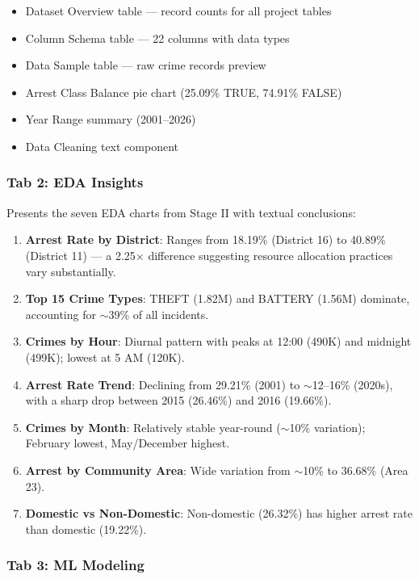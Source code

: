 \begin{itemize}
    \item Dataset Overview table — record counts for all project tables
    \item Column Schema table — 22 columns with data types
    \item Data Sample table — raw crime records preview
    \item Arrest Class Balance pie chart (25.09\% TRUE, 74.91\% FALSE)
    \item Year Range summary (2001--2026)
    \item Data Cleaning text component
\end{itemize}

\subsubsection{Tab 2: EDA Insights}

Presents the seven EDA charts from Stage II with textual conclusions:

\begin{enumerate}
    \item \textbf{Arrest Rate by District}: Ranges from 18.19\% (District 16) to 40.89\% (District 11) — a 2.25$\times$ difference suggesting resource allocation practices vary substantially.
    \item \textbf{Top 15 Crime Types}: THEFT (1.82M) and BATTERY (1.56M) dominate, accounting for $\sim$39\% of all incidents.
    \item \textbf{Crimes by Hour}: Diurnal pattern with peaks at 12:00 (490K) and midnight (499K); lowest at 5 AM (120K).
    \item \textbf{Arrest Rate Trend}: Declining from 29.21\% (2001) to $\sim$12--16\% (2020s), with a sharp drop between 2015 (26.46\%) and 2016 (19.66\%).
    \item \textbf{Crimes by Month}: Relatively stable year-round ($\sim$10\% variation); February lowest, May/December highest.
    \item \textbf{Arrest by Community Area}: Wide variation from $\sim$10\% to 36.68\% (Area 23).
    \item \textbf{Domestic vs Non-Domestic}: Non-domestic (26.32\%) has higher arrest rate than domestic (19.22\%).
\end{enumerate}

\subsubsection{Tab 3: ML Modeling}

